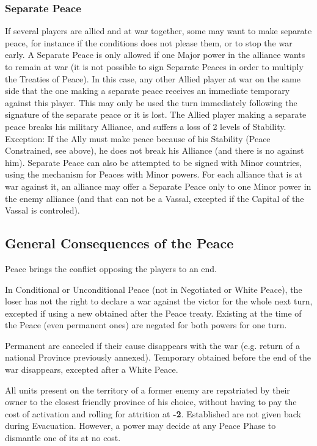 \subsubsection{Separate Peace}
\aparag If several players are allied and at war together, some may want to
make separate peace, for instance if the conditions does not please them, or
to stop the war early. A Separate Peace is only allowed if one Major power in
the alliance wants to remain at war (it is not possible to sign Separate
Peaces in order to multiply the Treaties of Peace).
In this case, any other Allied player at war on the same side that the one
making a separate peace receives an immediate temporary \CB against this
player.
\bparag This \CB may only be used the turn immediately following the signature
of the separate peace or it is lost.
\bparag The Allied player making a separate peace breaks his military
Alliance, and suffers a loss of 2 levels of Stability.
\bparag Exception: If the Ally must make peace because of his Stability (Peace
Constrained, see above), he does not break his Alliance (and there is no \CB
against him).
\aparag Separate Peace can also be attempted to be signed with Minor
countries, using the mechanism for Peaces with Minor powers. For each alliance
that is at war against it, an alliance may offer a Separate Peace only to one
Minor power in the enemy alliance (and that can not be a Vassal, excepted if
the Capital of the Vassal is controled).



\subsection{General Consequences of the Peace}

\aparag Peace brings the conflict opposing the players to an end.

\aparag In Conditional or Unconditional Peace (not in Negotiated or White
Peace), the loser has not the right to declare a war against the victor for
the whole next turn, excepted if using a new \CB obtained after the Peace
treaty.  Existing \CB at the time of the Peace (even permanent ones) are
negated for both powers for one turn.

Permanent \CB are canceled if their cause disappears with the war (e.g.
return of a national Province previously annexed). Temporary \CB obtained
before the end of the war disappears, excepted after a White Peace.

\label{chPeace:Evacuation}
All units present on the territory of a former enemy are repatriated by their
owner to the closest friendly province of his choice, without having to pay
the cost of activation and rolling for attrition at {\bf -2}.
\bparag Established \Presidios are not given back during Evacuation.
\bparag However, a power may decide at any Peace Phase to dismantle one of its
\Presidios at no cost.

